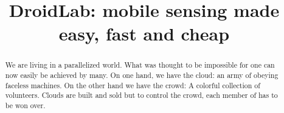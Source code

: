 \documentclass[conference,letterpaper]{IEEEtran}
\begin{document}

\title{DroidLab: mobile sensing made easy, fast and cheap}
\author{
  }




\maketitle


\begin{abstract}
We are living in a parallelized world. What was thought to be impossible for one can now easily be achieved by many. On one hand, we have the cloud: an army of obeying faceless machines. On the other hand we have the crowd: A colorful collection of volunteers. Clouds are built and sold but to control the crowd, each member of has to be won over.
\end{abstract}

\begin{IEEEkeywords}
\end{IEEEkeywords}
 
\end{document}
